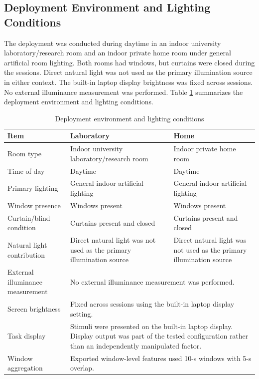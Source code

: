 \documentclass[dvipdfmx]{ehis}
\begin{document}
\subsection{Deployment Environment and Lighting Conditions}
The deployment was conducted during daytime in an indoor university laboratory/research room and an indoor private home room under general artificial room lighting.
Both rooms had windows, but curtains were closed during the sessions.
Direct natural light was not used as the primary illumination source in either context.
The built-in laptop display brightness was fixed across sessions.
No external illuminance measurement was performed.
Table \ref{tab:environment_config} summarizes the deployment environment and lighting conditions.

\begin{table}[t]
\caption{Deployment environment and lighting conditions}
\label{tab:environment_config}
\begin{center}
\small
\begin{tabular}{p{}p{}p{}}
\toprule
\textbf{Item} & \textbf{Laboratory} & \textbf{Home} \\
\midrule
Room type & Indoor university laboratory/research room & Indoor private home room \\
Time of day & Daytime & Daytime \\
Primary lighting & General indoor artificial lighting & General indoor artificial lighting \\
Window presence & Windows present & Windows present \\
Curtain/blind condition & Curtains present and closed & Curtains present and closed \\
Natural light contribution & Direct natural light was not used as the primary illumination source & Direct natural light was not used as the primary illumination source \\
External illuminance measurement & \multicolumn{2}{p{0.64\textwidth}}{No external illuminance measurement was performed.} \\
Screen brightness & \multicolumn{2}{p{0.64\textwidth}}{Fixed across sessions using the built-in laptop display setting.} \\
Task display & \multicolumn{2}{p{0.64\textwidth}}{Stimuli were presented on the built-in laptop display. Display output was part of the tested configuration rather than an independently manipulated factor.} \\
Window aggregation & \multicolumn{2}{p{0.64\textwidth}}{Exported window-level features used 10-s windows with 5-s overlap.} \\

\end{tabular}
\end{center}
\end{table}
\end{document}

